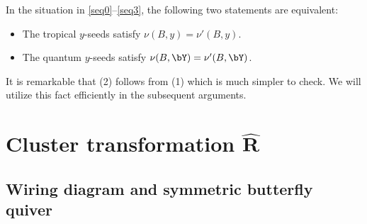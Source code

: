 \begin{Theorem}\label{thm:piv}
 In the situation in \eqref{seq0}--\eqref{seq3}, the following two
 statements are equivalent:
\begin{itemize}\itemsep=0pt

\item[$(1)$]
The tropical $y$-seeds satisfy $\nu (B,y) = \nu'(B,y)$.

\item[$(2)$]
The quantum $y$-seeds satisfy $\nu (B,\bY) = \nu'(B,\bY)$.

\end{itemize}
\end{Theorem}

It is remarkable that (2) follows from (1) which is much simpler to check.
We will utilize this fact efficiently
in the subsequent arguments.


\section[Cluster transformation R]{Cluster transformation $\boldsymbol{\widehat{R}}$}\label{s:ct}

\subsection{Wiring diagram and symmetric butterfly quiver}


